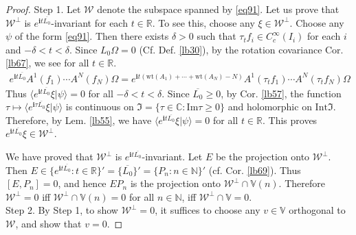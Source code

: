 \documentclass[12pt,b5paper,notitlepage]{article}
\theoremstyle{definition}
\theoremstyle{plain}
\newcommand{\fk}{\mathfrak}
\newcommand{\mc}{\mathcal}
\newcommand{\ovl}{\overline}
\newcommand{\bk}[1]{\langle {#1}\rangle}
\newcommand{\im}{\mathbf{i}}
\newcommand{\Vbb}{\mathbb V}
\newcommand{\Cbb}{\mathbb C}
\newcommand{\Nbb}{\mathbb N}
\newcommand{\Rbb}{\mathbb R}
\newcommand{\wt}{\mathrm{wt}}
\newcommand{\Imag}{\mathrm{Im}}
\newcommand{\Int}{\mathrm{Int}}
\numberwithin{equation}{section}
\begin{document}
\begin{proof}
Step 1. Let $\mc W$ denote the subspace spanned by \eqref{eq91}. Let us prove that $\mc W^\perp$ is $e^{\im t\ovl{L_0}}$-invariant for each $t\in\Rbb$. To see this, choose any $\xi\in\mc W^\perp$. Choose any $\psi$ of the form \eqref{eq91}. Then there exists $\delta>0$ such that $\tau_tf_i\in C_c^\infty(I_i)$ for each $i$ and $-\delta<t<\delta$. Since $L_0\Omega=0$ (Cf. Def. \ref{lb30}), by the rotation covariance Cor. \ref{lb67}, we see for all $t\in\Rbb$.
\begin{align*}
e^{\im t\ovl{L_0}}A^1(f_1)\cdots A^N(f_N)\Omega=e^{\im t(\wt(A_1)+\cdots+\wt(A_N)-N)}A^1(\tau_tf_1)\cdots A^N(\tau_tf_N)\Omega
\end{align*}
Thus $\bk{e^{\im t\ovl{L_0}}\xi|\psi}=0$ for all $-\delta<t<\delta$. Since $\ovl{L_0}\geq0$, by Cor. \ref{lb57}, the function $\tau\mapsto\bk{e^{\im\tau\ovl{L_0}}\xi|\psi}$ is continuous on $\fk I=\{\tau\in\Cbb:\Imag\tau\geq0\}$ and holomorphic on $\Int\fk I$. Therefore, by Lem. \ref{lb55}, we have $\bk{e^{\im t\ovl{L_0}}\xi|\psi}=0$ for all $t\in\Rbb$. This proves $e^{\im t\ovl{L_0}}\xi\in\mc W^\perp$. 


We have proved that $\mc W^\perp$ is $e^{\im t\ovl{L_0}}$-invariant. Let $E$ be the projection onto $\mc W^\perp$. Then $E\in\{e^{\im t\ovl{L_0}}:t\in\Rbb\}'=\{\ovl{L_0}\}'=\{P_n:n\in\Nbb\}'$ (cf. Cor. \ref{lb69}). Thus $[E,P_n]=0$, and hence $EP_n$ is the projection onto $\mc W^\perp\cap\Vbb(n)$. Therefore $\mc W^\perp=0$ iff $\mc W^\perp\cap\Vbb(n)=0$ for all $n\in\Nbb$, iff $\mc W^\perp\cap\Vbb=0$.\\[-1ex]

Step 2. By Step 1, to show $\mc W^\perp=0$, it suffices to choose any $v\in\Vbb$ orthogonal to $\mc W$, and show that $v=0$.


\end{proof}
\end{document}
